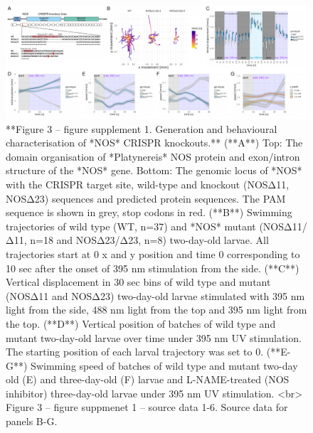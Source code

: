 \documentclass[
  10pt,
  onecolumn]{article}
\begin{document}
\begin{figure}
\includegraphics[width=44.44in]{figures/Fig3_sup1} \caption{**Figure 3 -- figure supplement 1. Generation and behavioural characterisation of *NOS* CRISPR knockouts.** (**A**) Top: The domain organisation of *Platynereis* NOS protein and exon/intron structure of the *NOS* gene. Bottom: The genomic locus of *NOS* with the CRISPR target site, wild-type and knockout (NOSΔ11, NOSΔ23) sequences and predicted protein sequences. The PAM sequence is shown in grey, stop codons in red. (**B**) Swimming trajectories of wild type (WT, n=37) and *NOS* mutant (NOSΔ11/Δ11, n=18 and NOSΔ23/Δ23, n=8) two-day-old larvae. All trajectories start at 0 x and y position and time 0 corresponding to 10 sec after the onset of 395 nm stimulation from the side. (**C**)  Vertical displacement in 30 sec bins of wild type and mutant (NOSΔ11 and NOSΔ23) two-day-old larvae stimulated with 395 nm light from the side, 488 nm light from the top and 395 nm light from the top. (**D**) Vertical position of batches of wild type and mutant two-day-old larvae over time under 395 nm UV stimulation. The starting position of each larval trajectory was set to 0. (**E-G**) Swimming speed of batches of wild type and mutant two-day old (E) and three-day-old (F) larvae and L-NAME-treated (NOS inhibitor) three-day-old larvae under 395 nm UV stimulation. <br> Figure 3 -- figure suppmenet 1 -- source data 1-6. Source data for panels B-G.}\label{fig:unnamed-chunk-12}
\end{figure}
\end{document}
